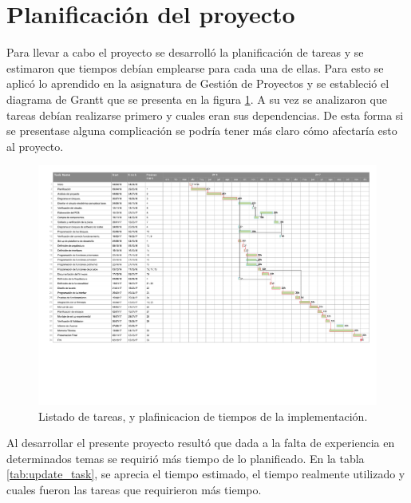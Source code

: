 \section{Planificación del proyecto}
Para llevar a cabo el proyecto se desarrolló la planificación de tareas y se estimaron que tiempos debían emplearse para cada una de ellas.
Para esto se aplicó lo aprendido en la asignatura de Gestión de Proyectos y se estableció el diagrama de Grantt que se presenta en la figura \ref{fig:gantt}.  
A su vez se analizaron que tareas debían realizarse primero y cuales eran sus dependencias. De esta forma si se presentase alguna complicación se podría tener más claro cómo afectaría esto al proyecto.


\begin{landscape}
  \pagestyle{empty}
  \begin{figure}[htb]
      \centering
          \includegraphics[page=1,clip, trim=0.5cm 5cm 0cm 0cm, width=1.70\textwidth]{./Figures/gantt.pdf}
      \caption{Listado de tareas, y plafinicacion de tiempos de la implementación.}
      \label{fig:gantt}
  \end{figure}
\end{landscape}


Al desarrollar el presente proyecto resultó que dada a la falta de experiencia en determinados temas se requirió más tiempo de lo planificado. En la tabla \ref{tab:update_task}, se aprecia el tiempo estimado, el tiempo realmente utilizado y cuales fueron las tareas que requirieron más tiempo.

